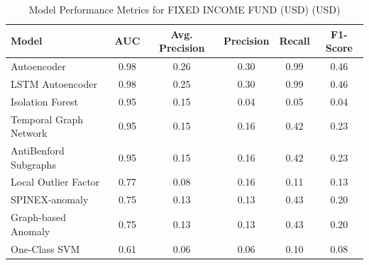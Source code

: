 \documentclass[11pt]{article}
\begin{document}
\begin{table}[h]

\centering

\caption{Model Performance Metrics for FIXED INCOME FUND (USD) (USD)}

\begin{tabular}{lccccc}

\hline

Model & AUC & Avg. Precision & Precision & Recall & F1-Score \\

\hline

Autoencoder & 0.98 & 0.26 & 0.30 & 0.99 & 0.46 \\

LSTM Autoencoder & 0.98 & 0.25 & 0.30 & 0.99 & 0.46 \\

Isolation Forest & 0.95 & 0.15 & 0.04 & 0.05 & 0.04 \\

Temporal Graph Network & 0.95 & 0.15 & 0.16 & 0.42 & 0.23 \\

AntiBenford Subgraphs & 0.95 & 0.15 & 0.16 & 0.42 & 0.23 \\

Local Outlier Factor & 0.77 & 0.08 & 0.16 & 0.11 & 0.13 \\

SPINEX-anomaly & 0.75 & 0.13 & 0.13 & 0.43 & 0.20 \\

Graph-based Anomaly & 0.75 & 0.13 & 0.13 & 0.43 & 0.20 \\

One-Class SVM & 0.61 & 0.06 & 0.06 & 0.10 & 0.08 \\

\hline

\end{tabular}

\end{table}
\end{document}
